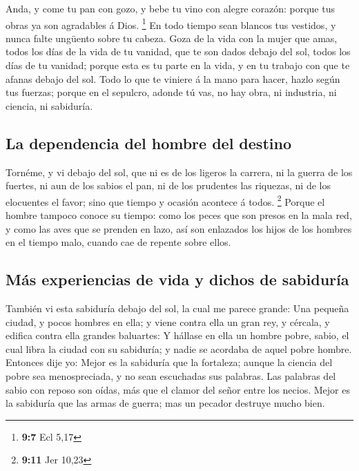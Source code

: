  Anda, y come tu pan con gozo, y bebe tu vino con alegre
corazón: porque tus obras ya son agradables á Dios. \footnote{\textbf{9:7}
  Ecl 5,17}  En todo tiempo sean blancos tus vestidos, y
nunca falte ungüento sobre tu cabeza.  Goza de la vida con
la mujer que amas, todos los días de la vida de tu vanidad, que te son
dados debajo del sol, todos los días de tu vanidad; porque esta es tu
parte en la vida, y en tu trabajo con que te afanas debajo del sol.
 Todo lo que te viniere á la mano para hacer, hazlo según
tus fuerzas; porque en el sepulcro, adonde tú vas, no hay obra, ni
industria, ni ciencia, ni sabiduría.

\hypertarget{la-dependencia-del-hombre-del-destino}{%
\subsection{La dependencia del hombre del
destino}\label{la-dependencia-del-hombre-del-destino}}

 Tornéme, y vi debajo del sol, que ni es de los ligeros la
carrera, ni la guerra de los fuertes, ni aun de los sabios el pan, ni de
los prudentes las riquezas, ni de los elocuentes el favor; sino que
tiempo y ocasión acontece á todos. \footnote{\textbf{9:11} Jer 10,23}
 Porque el hombre tampoco conoce su tiempo: como los peces
que son presos en la mala red, y como las aves que se prenden en lazo,
así son enlazados los hijos de los hombres en el tiempo malo, cuando cae
de repente sobre ellos.

\hypertarget{muxe1s-experiencias-de-vida-y-dichos-de-sabiduruxeda}{%
\subsection{Más experiencias de vida y dichos de
sabiduría}\label{muxe1s-experiencias-de-vida-y-dichos-de-sabiduruxeda}}

 También vi esta sabiduría debajo del sol, la cual me
parece grande:  Una pequeña ciudad, y pocos hombres en
ella; y viene contra ella un gran rey, y cércala, y edifica contra ella
grandes baluartes:  Y hállase en ella un hombre pobre,
sabio, el cual libra la ciudad con su sabiduría; y nadie se acordaba de
aquel pobre hombre.  Entonces dije yo: Mejor es la
sabiduría que la fortaleza; aunque la ciencia del pobre sea
menospreciada, y no sean escuchadas sus palabras.  Las
palabras del sabio con reposo son oídas, más que el clamor del señor
entre los necios.  Mejor es la sabiduría que las armas de
guerra; mas un pecador destruye mucho bien.

